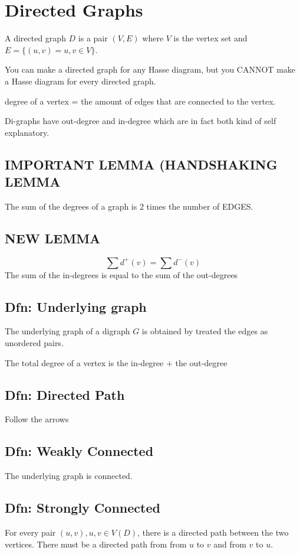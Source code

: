\documentclass{report}
\begin{document}
\chapter{Directed Graphs}
A directed graph $D$ is a pair $(V,E)$ where $V$ is the vertex set and $E = \{ (u, v) = u, v \in V \}$.

You can make a directed graph for any Hasse diagram, but you CANNOT make a Hasse diagram for every directed graph.

degree of a vertex = the amount of edges that are connected to the vertex.

Di-graphs have out-degree and in-degree which are in fact both kind of self explanatory.

\section{IMPORTANT LEMMA (HANDSHAKING LEMMA}
The sum of the degrees of a graph is 2 times the number of EDGES.

\section{NEW LEMMA}
\[
\sum d^+(v) = \sum d^- (v)
\]
The sum of the in-degrees is equal to the sum of the out-degrees

\section{Dfn: Underlying graph}
The underlying graph of a digraph $G$ is obtained by treated the edges as unordered pairs.

The total degree of a vertex is the in-degree + the out-degree

\section{Dfn: Directed Path}
Follow the arrows

\section{Dfn: Weakly Connected}
The underlying graph is connected.

\section{Dfn: Strongly Connected}
For every pair $(u, v), u, v \in V(D)$, there is a directed path between the two vertices. There must be a directed path from from $u$ to $v$ and from $v$ to $u$.
\end{document}
